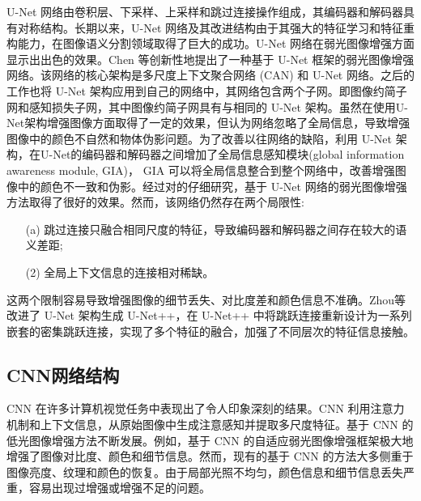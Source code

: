 \documentclass[a4paper]{ctexart}
\begin{document}
	U-Net 网络由卷积层、下采样、上采样和跳过连接操作组成，其编码器和解码器具有对称结构。长期以来，U-Net 网络及其改进结构由于其强大的特征学习和特征重构能力，在图像语义分割领域取得了巨大的成功。U-Net 网络在弱光图像增强方面显示出出色的效果。Chen 等\cite{chen2018learning}创新性地提出了一种基于 U-Net 框架的弱光图像增强网络。该网络的核心架构是多尺度上下文聚合网络 (CAN) 和 U-Net 网络。之后的工作\cite{chen2018learning, zamir2021learning}也将 U-Net 架构应用到自己的网络中，其网络包含两个子网。即图像约简子网和感知损失子网，其中图像约简子网具有与\cite{chen2018learning}相同的 U-Net 架构。虽然\cite{chen2018learning, zamir2021learning}在使用U-Net架构增强图像方面取得了一定的效果，但\cite{meng2020gia}认为\cite{chen2018learning, zamir2021learning}网络忽略了全局信息，导致增强图像中的颜色不自然和物体伪影问题。为了改善以往网络的缺陷，利用 U-Net 架构，\cite{meng2020gia}在U-Net的编码器和解码器之间增加了全局信息感知模块(global information awareness module, GIA)， GIA 可以将全局信息整合到整个网络中，改善增强图像中的颜色不一致和伪影。经过对\cite{chen2018learning, meng2020gia, zamir2021learning}的仔细研究，基于 U-Net 网络的弱光图像增强方法取得了很好的效果。然而，该网络仍然存在两个局限性:
	
	\begin{itemize}
		\item[(a)] 
		跳过连接只融合相同尺度的特征，导致编码器和解码器之间存在较大的语义差距;
		
		\item[(2)]
		全局上下文信息的连接相对稀缺。
	\end{itemize}	
	
	这两个限制容易导致增强图像的细节丢失、对比度差和颜色信息不准确。Zhou等\cite{zhou2018unet++,zhou2019unet++}改进了 U-Net 架构生成 U-Net++，在 U-Net++ 中将跳跃连接重新设计为一系列嵌套的密集跳跃连接，实现了多个特征的融合，加强了不同层次的特征信息接触。
	
	\subsection{CNN网络结构}
	
	CNN 在许多计算机视觉任务中表现出了令人印象深刻的结果。CNN 利用注意力机制\cite{yang2021locally, zhang2020attention}和上下文信息，从原始图像中生成注意感知并提取多尺度特征\cite{li2018multi,zamir2020learning}。基于 CNN 的低光图像增强方法不断发展。例如，基于 CNN 的自适应弱光图像增强框架\cite{li2020visual}极大地增强了图像对比度、颜色和细节信息。然而，现有的基于 CNN 的方法大多侧重于图像亮度、纹理和颜色的恢复\cite{xu2020learning}。由于局部光照不均匀，颜色信息和细节信息丢失严重，容易出现过增强或增强不足的问题。
	
\end{document}
